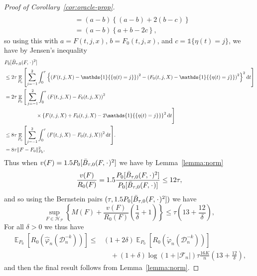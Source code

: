 \documentclass[a4paper,danish]{article}
\theoremstyle{plain} %
\numberwithin{theorem}{section}
\theoremstyle{definition} %
\theoremstyle{remark}
\DeclareMathOperator{\E}{\mathbb{E}} %
\newcommand{\blank}{\makebox[1ex]{\textbf{$\cdot$}}}
\renewcommand{\phi}{\varphi}
\newcommand*\diff{\mathop{}\!\mathrm{d}}
\newcommand{\1}{\mathds{1}}
\newcommand{\data}{\ensuremath{\mathcal{D}}}
\begin{document}
\begin{proof}[Proof of Corollary~\ref{cor:oracle-prop}]
\begin{align*}
  \\
  & = (a-b)
    \left\{
    (a-b) +  2(b-c)
    \right\}
  \\
  & = (a-b)
    \left\{
     a + b -2c
    \right\},
\end{align*}
so using this with \( a=F(t, j, x) \), \( b=F_0(t, j, x) \), and
\( c = \1{\{\eta(t) = j\}} \), we have by Jensen's inequality
\begin{align*}
  & P_0{[\bar{B}_{\tau,0}(F, \blank)^2]}
  \\
  & \leq
    2\tau\E_{P_0}{\left[
    \sum_{j=-1}^{2} \int_0^{\tau}
    \left\{
    \left(
    F(t, j, X) - \1{\{\eta(t) = j\}}
    \right)^2
    -
    \left(
    F_0(t, j, X) - \1{\{\eta(t) = j\}}
    \right)^2
    \right\}^2
    \diff t 
    \right]}
  \\
  & =2\tau
    \E_{P_0}\Bigg[
    \sum_{j=-1}^{2} \int_0^{\tau}
    \left(
    F(t, j, X) - F_0(t, j, X)
    \right)^2
  \\
  & \quad \quad \quad\quad \quad \quad \times
    \left\{
    F(t, j, X) +  F_0(t, j, X)-2 \1{\{\eta(t) = j\}}
    \right\}^2
    \diff t 
    \Bigg]
  \\
  & \leq
    8\tau \E_{P_0}{\left[
    \sum_{j=-1}^{2} \int_0^{\tau}
    \left(
    F(t, j, X) - F_0(t, j, X)
    \right)^2
    \diff t 
    \right]}.
  \\
  & =
    8\tau \Vert F - F_0 \Vert_{P_0}^2.
\end{align*}
Thus when \( v(F) = 1.5 P_0{[\bar{B}_{\tau,0}(F, \blank)^2]} \) we have by
Lemma~\ref{lemma:norm}
\begin{equation*}
  \frac{v(F)}{R_0(F)}
  = 1.5 \frac{P_0{[\bar{B}_{\tau,0}(F, \blank)^2]}}{P_0{[\bar{B}_{\tau,0}(F, \blank)]}}
  \leq 12 \tau,
\end{equation*}
and so using the Bernstein pairs \( (\tau, 1.5 P_0{[\bar{B}_{\tau,0}(F, \blank)^2]}) \) we have
\begin{equation*}
  \sup_{F \in \mathcal{H}_{\mathcal{P}}}
  \left\{
    M(F) + \frac{v(F)}{R_0(F)}
    \left(
      \frac{1}{\delta} + 1
    \right)
  \right\}
  \leq \tau
  \left(
    13 + \frac{12}{\delta}
  \right),
\end{equation*}
For all $\delta>0$ we thus have
\begin{align*}
  \E_{P_0}{\left[ R_0(\hat{\phi}_n(\data_n^{-k})) \right]}
  \leq
  &(1+2\delta)\E_{P_0}{\left[ R_0(\tilde{\phi}_n(\data_n^{-k})) \right]}
  \\
  & \quad
    + (1+\delta)\log(1 + |\mathcal{F}_n|) \tau \frac{16 K}{n}
    \left(
    13 + \frac{12}{\delta}
    \right),
\end{align*}
and then the final result follows from Lemma~\ref{lemma:norm}.
\end{proof}
\end{document}
